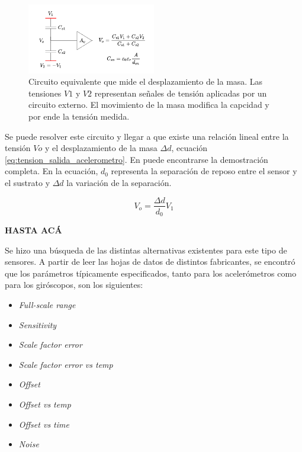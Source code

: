 \begin{figure}[H]
    \centering
    \includegraphics[width=0.5\textwidth]{img/acelerometro_sensado_capacitivo.png}
    \caption{Circuito equivalente que mide el desplazamiento de la masa. Las tensiones $V1$ y $V2$ representan señales de tensión aplicadas por un circuito externo. El movimiento de la masa modifica la capcidad y por ende la tensión medida.}
    \label{fig:acelerometro_sensado_capacitivo}    
\end{figure}

Se puede resolver este circuito y llegar a que existe una relación lineal entre la tensión $Vo$ y el desplazamiento de la masa $\Delta d$, ecuación \eqref{eq:tension_salida_acelerometro}. En \cite{zhang2010sensing} puede encontrarse la demostración completa. En la ecuación, $d_0$ representa la separación de reposo entre el sensor y el sustrato y $\Delta d$ la variación de la separación.

\begin{equation}
    V_{o} = \frac{\Delta d}{d_0} V_1
    \label{eq:tension_salida_acelerometro}
\end{equation}

\textbf{{\color{red} HASTA ACÁ}}


Se hizo una búsqueda de las distintas alternativas existentes para este tipo de sensores. A partir de leer las hojas de datos de distintos fabricantes, se encontró que los parámetros típicamente especificados, tanto para los acelerómetros como para los giróscopos, son los siguientes:

\begin{itemize}
    \item \textit{Full-scale range}
    \item \textit{Sensitivity}
    \item \textit{Scale factor error}
    \item \textit{Scale factor error vs temp}
    \item \textit{Offset}
    \item \textit{Offset vs temp}
    \item \textit{Offset vs time}
    \item \textit{Noise}
\end{itemize}

